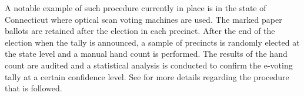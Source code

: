 A notable example of such procedure currently in place is in the state
of Connecticut where optical scan voting machines are used. The marked
paper ballots are retained after the election in each precinct. After
the end of the election when the tally is announced, a sample of
precincts is randomly elected at the state level and a manual hand
count is performed. The results of the hand count are audited and a
statistical analysis is conducted to confirm the e-voting tally at a
certain confidence level.  See \cite{connecticut-audit} for more
details regarding the procedure that is followed.



